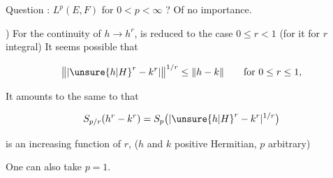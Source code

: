 Question :    $L^p(E,F)$  for $0<p<\infty$ ? Of no importance.

) For the continuity of $h\to h^r$,  is reduced to the case $0\leq r<1$ (for it   for $r$ integral) It seems possible that

\[
\bigl\|\lvert {\unsure{h|H}}^r-k^r\rvert\bigr\|^{1/r}\leq\|h-k\|\qquad\text{for }0\leq r\leq1,
\]

It amounts to the same to  that

\[
S_{p/r}(h^r-k^r)=S_p\bigl(\lvert {\unsure{h|H}}^r-k^r\rvert^{1/r}\bigr)
\]

is an increasing function of $r$, ($h$ and $k$ positive Hermitian, $p$ arbitrary)

One can also take $p=1$.

